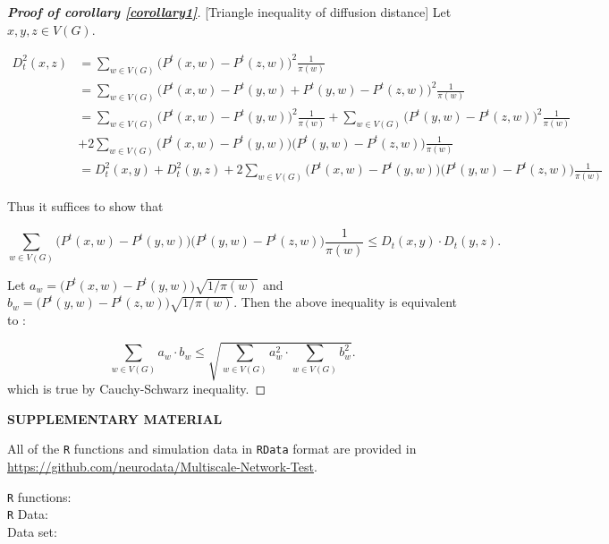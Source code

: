 \documentclass[12pt]{article}
\theoremstyle{definition}
\begin{document}
\begin{proof}[\textbf{Proof of corollary \ref{corollary1}}][Triangle inequality of diffusion distance]
Let $x, y, z \in V(G).$
	
\begin{equation}
\begin{split}
D^{2}_{t}(x,z) & = \sum\limits_{w \in V(G)} \big( P^{t}(x,w) - P^{t}(z,w)   \big)^2 \frac{1}{\pi(w)}  \\ & = \sum\limits_{w \in V(G)} \big(P^{t}(x, w) - P^{t}(y,w) + P^{t}(y,w) - P^{t}(z,w) \big)^2 \frac{1}{\pi(w)} \\ & = \sum\limits_{w \in V(G)} \big( P^{t}(x,w) - P^{t}(y,w) \big)^2 \frac{1}{\pi(w)}  + \sum\limits_{w \in V(G)} \big( P^{t}(y,w) - P^{t}(z,w)  \big)^2 \frac{1}{\pi(w)} \\ & + 2 \sum\limits_{w \in V(G)} \big( P^{t}(x,w) - P^{t}(y,w)  \big) \big( P^{t}(y,w) - P^{t}(z,w)  \big)\frac{1}{\pi(w)} \\ &= D^{2}_{t}(x,y) + D^{2}_{t}(y,z) +  2 \sum\limits_{w \in V(G)} \big( P^{t}(x,w) - P^{t}(y,w)  \big) \big( P^{t}(y,w) - P^{t}(z,w)  \big)\frac{1}{\pi(w)}   
\end{split}
\end{equation}
	
Thus it suffices to show that 
	
\begin{equation}
\sum\limits_{w \in V(G)} \big( P^{t}(x,w) - P^{t}(y,w)  \big) \big( P^{t}(y,w) - P^{t}(z,w)  \big)\frac{1}{\pi(w)} \leq D_{t}(x,y) \cdot D_{t}(y,z). 
\end{equation}
	
Let $a_{w} = \big(P^{t}(x,w) - P^{t}(y,w) \big) \sqrt{1 / \pi(w)}$ and $b_{w} = \big( P^{t}(y,w) - P^{t}(z,w) \big) \sqrt{1 / \pi(w)}$. Then the above inequality is equivalent to :
	
\begin{equation} 
\sum\limits_{w \in V(G)} a_{w} \cdot b_{w} \leq \sqrt{\sum\limits_{w \in V(G)} a^2_{w} \cdot \sum\limits_{w \in V(G)} b^2_{w} }.
\end{equation}
which is true by Cauchy-Schwarz inequality.
\end{proof}	
	


	
\newpage
\bigskip
\begin{center}
	{\large\bf SUPPLEMENTARY MATERIAL}
\end{center}
	
All of the \texttt{R} functions and simulation data in \texttt{RData} format are provided in \url{https://github.com/neurodata/Multiscale-Network-Test}.
	
\begin{description}
		
\item[\texttt{R} functions:] 
		
		
\item[\texttt{R} Data:] 
		
\item[Data set:]


 
\end{description}
	
	
\end{document}
